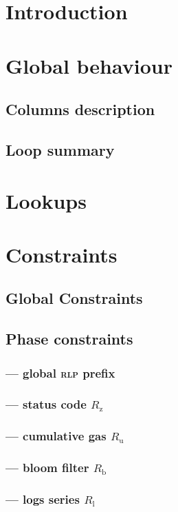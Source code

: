 \section{Introduction} 

\section{Global behaviour}
\subsection{Columns description}                            
\subsection{Loop summary}                                   

\section{Lookups}                                           

\section{Constraints}
\subsection{Global Constraints}                             

\subsection{Phase constraints}
\subsubsection{ --- global \textsc{rlp} prefix}    
\subsubsection{ --- status code $R_\text{z}$}      
\subsubsection{ --- cumulative gas $R_\text{u}$}   
\subsubsection{ --- bloom filter $R_\text{b}$}     
\subsubsection{ --- logs series $R_\text{l}$}      
